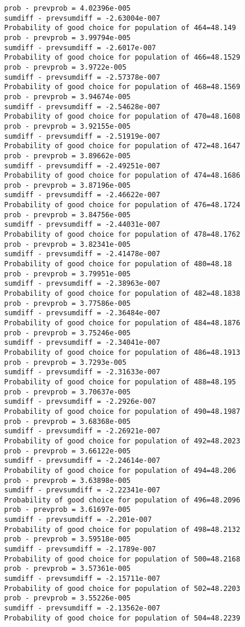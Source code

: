 \documentclass[11pt,onecolumn]{article}
\begin{document}
\begin{verbatim}
prob - prevprob = 4.02396e-005
sumdiff - prevsumdiff = -2.63004e-007
Probability of good choice for population of 464=48.149
prob - prevprob = 3.99794e-005
sumdiff - prevsumdiff = -2.6017e-007
Probability of good choice for population of 466=48.1529
prob - prevprob = 3.9722e-005
sumdiff - prevsumdiff = -2.57378e-007
Probability of good choice for population of 468=48.1569
prob - prevprob = 3.94674e-005
sumdiff - prevsumdiff = -2.54628e-007
Probability of good choice for population of 470=48.1608
prob - prevprob = 3.92155e-005
sumdiff - prevsumdiff = -2.51919e-007
Probability of good choice for population of 472=48.1647
prob - prevprob = 3.89662e-005
sumdiff - prevsumdiff = -2.49251e-007
Probability of good choice for population of 474=48.1686
prob - prevprob = 3.87196e-005
sumdiff - prevsumdiff = -2.46622e-007
Probability of good choice for population of 476=48.1724
prob - prevprob = 3.84756e-005
sumdiff - prevsumdiff = -2.44031e-007
Probability of good choice for population of 478=48.1762
prob - prevprob = 3.82341e-005
sumdiff - prevsumdiff = -2.41478e-007
Probability of good choice for population of 480=48.18
prob - prevprob = 3.79951e-005
sumdiff - prevsumdiff = -2.38963e-007
Probability of good choice for population of 482=48.1838
prob - prevprob = 3.77586e-005
sumdiff - prevsumdiff = -2.36484e-007
Probability of good choice for population of 484=48.1876
prob - prevprob = 3.75246e-005
sumdiff - prevsumdiff = -2.34041e-007
Probability of good choice for population of 486=48.1913
prob - prevprob = 3.7293e-005
sumdiff - prevsumdiff = -2.31633e-007
Probability of good choice for population of 488=48.195
prob - prevprob = 3.70637e-005
sumdiff - prevsumdiff = -2.2926e-007
Probability of good choice for population of 490=48.1987
prob - prevprob = 3.68368e-005
sumdiff - prevsumdiff = -2.26921e-007
Probability of good choice for population of 492=48.2023
prob - prevprob = 3.66122e-005
sumdiff - prevsumdiff = -2.24614e-007
Probability of good choice for population of 494=48.206
prob - prevprob = 3.63898e-005
sumdiff - prevsumdiff = -2.22341e-007
Probability of good choice for population of 496=48.2096
prob - prevprob = 3.61697e-005
sumdiff - prevsumdiff = -2.201e-007
Probability of good choice for population of 498=48.2132
prob - prevprob = 3.59518e-005
sumdiff - prevsumdiff = -2.1789e-007
Probability of good choice for population of 500=48.2168
prob - prevprob = 3.57361e-005
sumdiff - prevsumdiff = -2.15711e-007
Probability of good choice for population of 502=48.2203
prob - prevprob = 3.55226e-005
sumdiff - prevsumdiff = -2.13562e-007
Probability of good choice for population of 504=48.2239

\end{verbatim}
\end{document}
